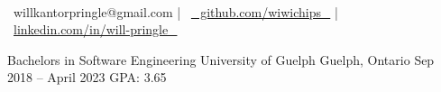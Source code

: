 \documentclass[]{awesome-cv}
\begin{document}
    
\begin{center}
	\headerfirstnamestyle{}  \\
	\vspace{2mm}
	{\faEnvelope\ willkantorpringle@gmail.com} | {\faGithub\ \href{https://github.com/wiwichips}{⠀github.com/wiwichips⠀}} | {\faLinkedin\ \href{https://www.linkedin.com/in/will-pringle/}{linkedin.com/in/will-pringle⠀}}
\end{center}
\begin{cventries}
	\cventry
	{Bachelors in Software Engineering}
	{University of Guelph}
	{Guelph, Ontario}
	{Sep 2018 – April 2023}
	{GPA: 3.65}
\end{cventries}
\end{document}
